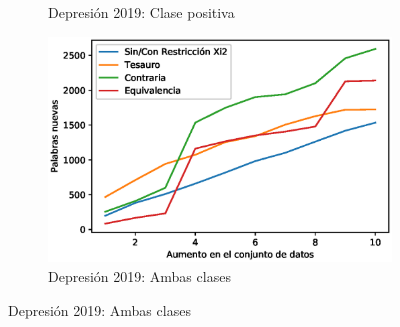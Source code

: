\begin{figure}[hbt!]
\begin{subfigure}[b]{0.5\textwidth}
        \caption{Depresión 2019: Clase positiva}
    \end{subfigure}
    \hfill
    \begin{subfigure}[b]{0.5\textwidth}
        \includegraphics[width=\textwidth]{sections/figures/both2019.eps}
        \caption{Depresión 2019: Ambas clases}
    \end{subfigure}
    

\end{figure}
